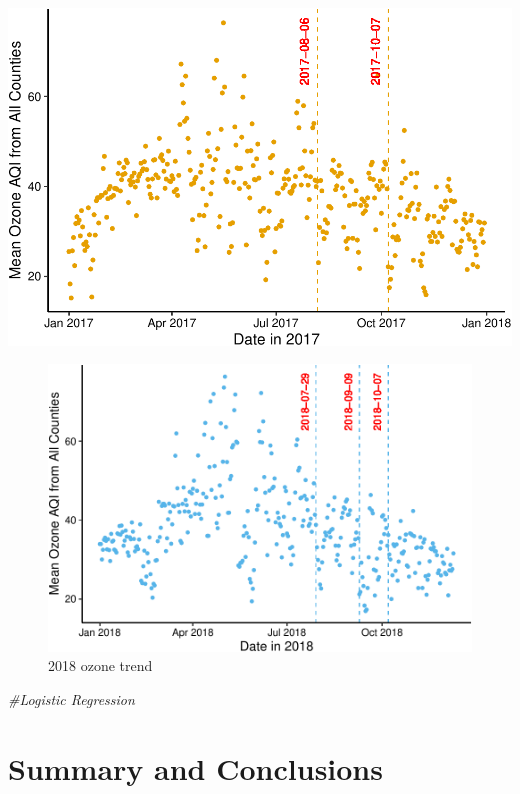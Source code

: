 \documentclass[12pt,]{article}
\newenvironment{Shaded}{\begin{snugshade}}{\end{snugshade}}
\newcommand{\CommentTok}[1]{\textcolor[rgb]{0.56,0.35,0.01}{\textit{#1}}}
\begin{document}
\pagebreak
\includegraphics{Xia_ENV_872_Project_files/figure-latex/Final visualization 2-1.pdf}

\begin{figure}
\centering
\includegraphics{Xia_ENV_872_Project_files/figure-latex/Final visualization 3-1.pdf}
\caption{2018 ozone trend}
\end{figure}

\begin{Shaded}
\begin{Highlighting}[]
\CommentTok{#Logistic Regression}
\end{Highlighting}
\end{Shaded}

\newpage

\section{Summary and Conclusions}\label{summary-and-conclusions}
\end{document}
